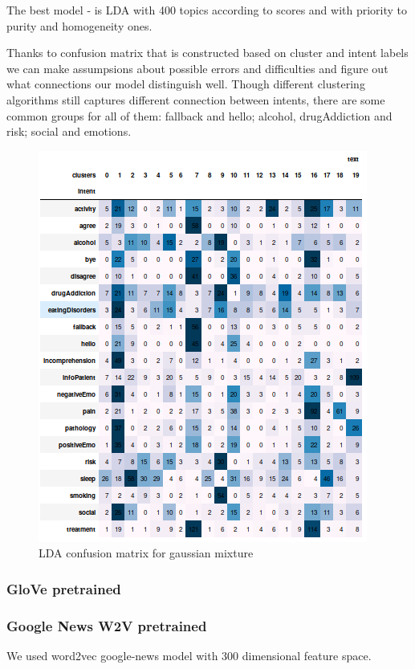 \documentclass[11pt]{article}
\begin{document}
The best model - is LDA with 400 topics according to scores and with priority to purity and homogeneity ones.

Thanks to confusion matrix that is constructed based on cluster and intent labels we can make assumpsions about possible errors and difficulties and figure out what connections our model distinguish well. Though different clustering algorithms still captures different connection between intents, there are some common groups for all of them: fallback and hello; alcohol, drugAddiction and risk; social and emotions.


\begin{figure}[h]
	\centering
	\includegraphics[scale=0.7]{lda_gm_cm.png}
	\caption{LDA confusion matrix for gaussian mixture}
\label{lda_gm_cm}
\end{figure}
\FloatBarrier


\subsubsection{GloVe pretrained}

\subsubsection{Google News W2V pretrained}

We used word2vec google-news model with 300 dimensional feature space.
\end{document}
